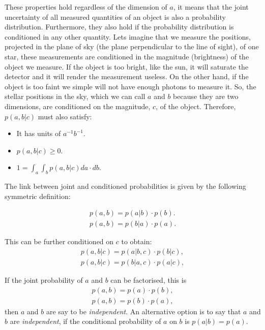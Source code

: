 These properties hold regardless of the dimension of $a$, it means that the joint uncertainty of all measured quantities of an object is also a probability distribution. Furthermore, they also hold if the probability distribution is conditioned in any other quantity. Lets imagine that we measure the positions, projected in the plane of sky (the plane perpendicular to the line of sight), of one star, these measurements are conditioned in the magnitude (brightness) of the object we measure. If the object is too bright, like the sun, it will saturate the detector and it will render the measurement useless. On the other hand, if the object is too faint we simple will not have enough photons to measure it. So, the stellar positions in the sky, which we can call $a$ and $b$ because they are two dimensions, are conditioned on the magnitude, $c$, of the object. Therefore, $p(a,b|c)$ must also satisfy:

\begin{itemize}
\item It has units of $a^{-1} b^{-1}$.
\item $p(a,b|c)\geq0$.
\item $1=\int_a \int_b p(a,b|c)da\cdot db$.
\end{itemize}

The link between joint and conditioned probabilities is given by the following symmetric definition:

\begin{align}
p(a,b)=p(a|b)\cdot p(b).\nonumber \\
p(a,b)=p(b|a) \cdot p(a).
\end{align}

This can be further conditioned on $c$ to obtain:
\begin{align}
\label{eq:conditioned}
p(a,b|c)=p(a|b,c)\cdot p(b|c),\nonumber \\
p(a,b|c)=p(b|a,c) \cdot p(a|c),
\end{align}

If the joint probability of $a$ and $b$ can be factorised, this is
\begin{align}
p(a,b)=p(a)\cdot p(b),\nonumber \\
p(a,b)=p(b) \cdot p(a),
\end{align}
then $a$ and $b$ are say to be \emph{independent}. An alternative option is to say that $a$ and $b$ are \emph{independent}, if the conditional probability of $a$ on $b$ is $p(a|b)=p(a)$.

